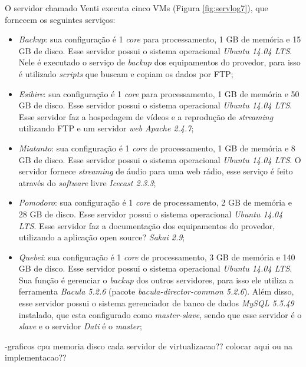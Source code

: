 O servidor chamado Venti executa cinco \ac{VM}s (Figura \ref{fig:servlog7}), que fornecem os seguintes serviços:
\begin{itemize}
 \item \textit{Backup}: sua configuração é 1 \textit{core} para processamento, 1 GB de memória e 15 GB de disco. Esse servidor possui o 
 sistema operacional \textit{Ubuntu 14.04 \ac{LTS}}. Nele é executado o serviço de \textit{backup} dos equipamentos do provedor, para isso 
 é utilizado \textit{scripts} que buscam e copiam os dados por \ac{FTP};
 
 \item \textit{Esibire}: sua configuração é 1 \textit{core} para processamento, 1 GB de memória e 50 GB de disco. Esse servidor possui o 
 sistema operacional \textit{Ubuntu 14.04 \ac{LTS}}. Esse servidor faz a hospedagem de vídeos e a reprodução de \textit{streaming} utilizando
 \ac{FTP} e um servidor \textit{web} \textit{Apache 2.4.7};
 
 \item \textit{Miatanto}: sua configuração é 1 \textit{core} de processamento, 1 GB de memória e 8 GB de disco. Esse servidor possui o 
 sistema operacional \textit{Ubuntu 14.04 \ac{LTS}}. O servidor fornece \textit{streaming} de áudio para uma web rádio, esse serviço é feito
 através do \textit{software} livre \textit{Icecast 2.3.3};
 
 \item \textit{Pomodoro}: sua configuração é 1 \textit{core} de processamento, 2 GB de memória e 28 GB de disco. Esse servidor possui o 
 sistema operacional \textit{Ubuntu 14.04 \ac{LTS}}. Esse servidor faz a documentação dos equipamentos do provedor, utilizando a aplicação
 open source? \textit{Sakai 2.9};
 
 \item \textit{Quebei}: sua configuração é 1 \textit{core} de processamento, 3 GB de memória e 140 GB de disco. Esse servidor possui o 
 sistema operacional \textit{Ubuntu 14.04 \ac{LTS}}. Sua função é gerenciar o \textit{backup} dos outros servidores, para isso ele utiliza a 
 ferramenta \textit{Bacula 5.2.6} (pacote \textit{bacula-director-common 5.2.6}). Além disso, esse servidor possui o sistema gerenciador de banco de dados 
 \textit{MySQL 5.5.49} instalado, que esta configurado como \textit{master-slave}, sendo que esse servidor é o \textit{slave} e o servidor 
 \textit{Dati} é o \textit{master};
\end{itemize}

-graficos cpu memoria disco cada servidor de virtualizacao?? colocar aqui ou na implementacao??

